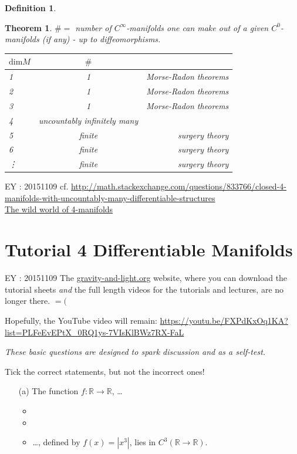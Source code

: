 \documentclass[10pt]{amsart}
\newtheorem{theorem}{Theorem}
\newtheorem{definition}{Definition}
\newcommand{\exercisehead}[1]
  { \smallskip
   \noindent{\small\bf Exercise #1.}
  }
\begin{document}
\begin{multicols*}{2}
\begin{definition}
	
	\end{definition}
	
	\begin{theorem}
	$\# = $ number of $C^{\infty}$-manifolds one can make out of a given $C^0$-manifolds (if any) - up to diffeomorphisms.  
	
	\begin{tabular}{l | c r }
	$\text{dim}M$ &  $\#$ &  \\
	\hline
	1  & 1  & Morse-Radon theorems \\
	2  & 1  & Morse-Radon theorems \\
	3 & 1  & Morse-Radon theorems \\
	4 & uncountably infinitely many & \\
	5 &   finite  & surgery theory \\
	6 &  finite & surgery theory \\
	\vdots & finite & surgery theory
	\end{tabular}
	
	\end{theorem}
	
	EY : 20151109 cf. \url{http://math.stackexchange.com/questions/833766/closed-4-manifolds-with-uncountably-many-differentiable-structures}  \\
	\href{http://www.maths.ed.ac.uk/~aar/papers/scorpan.pdf}{The wild world of 4-manifolds}
	
	
	\section*{Tutorial 4 Differentiable Manifolds}
	
	EY : 20151109 The \url{gravity-and-light.org} website, where you can download the tutorial sheets \emph{and} the full length videos for the tutorials and lectures, are no longer there.  $=($  
	
	Hopefully, the YouTube video will remain: \url{https://youtu.be/FXPdKxOq1KA?list=PLFeEvEPtX_0RQ1ys-7VIsKlBWz7RX-FaL}
	
	\exercisehead{1: True or false?} \emph{These basic questions are designed to spark discussion and as a self-test.}
	
	Tick the correct statements, but not the incorrect ones!
	
	\begin{enumerate}
	\item[(a)] The function $f: \mathbb{R} \to \mathbb{R}$, \dots
	\begin{itemize}
	\item  
	\item
	\item \dots , defined by $f(x) = |x^3|$, lies in $C^3(\mathbb{R} \to \mathbb{R})$.  
	

\end{itemize}
\end{enumerate}
\end{multicols*}
\end{document}
